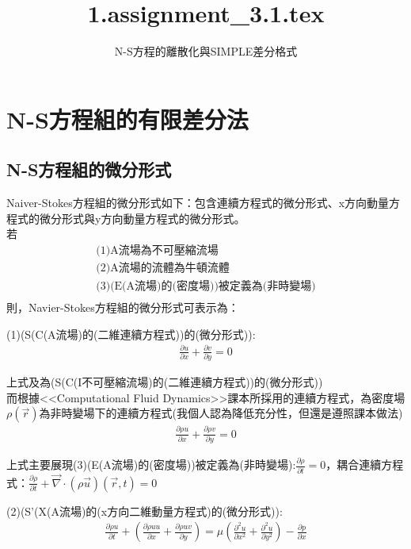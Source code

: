 \documentclass[12pt]{article}
\title{1.assignment\_3.1.tex}
\author{N-S方程的離散化與SIMPLE差分格式}
\begin{document}
\maketitle
\tableofcontents
\newpage
\section{N-S方程組的有限差分法}
\subsection{N-S方程組的微分形式}
Naiver-Stokes方程組的微分形式如下：包含連續方程式的微分形式、x方向動量方程式的微分形式與y方向動量方程式的微分形式。\\
\noindent 若
\[
\begin{array}{l}
    \text{(1)A流場為不可壓縮流場}\\[1.5ex]
    \text{(2)A流場的流體為牛頓流體}\\[1.5ex]
    \text{(3)(E(A流場)的(密度場))被定義為(非時變場)}\\[1.5ex]
\end{array}
\]
\noindent 則，Navier-Stokes方程組的微分形式可表示為：

(1)(S(C(A流場)的(二維連續方程式))的(微分形式)):
\begin{equation}\begin{split}
        \frac{\partial u}{\partial x} + \frac{\partial v}{\partial y} = 0 
\end{split}\end{equation}

上式及為(S(C(I不可壓縮流場)的(二維連續方程式))的(微分形式))\\
而根據<<Computational Fluid Dynamics>>課本所採用的連續方程式，為密度場$\rho(\vec{r})$為非時變場下的連續方程式(我個人認為降低充分性，但還是遵照課本做法)
\begin{equation}\begin{split}
    \frac{\partial \rho u }{\partial x} + \frac{\partial\rho v }{\partial y} = 0
\end{split}\end{equation}

上式主要展現(3)(E(A流場)的(密度場))被定義為(非時變場):$\frac{\partial \rho}{\partial t} = 0$，耦合連續方程式：$\frac{\partial \rho}{\partial t} + \vec{\nabla}\cdot (\rho\vec{u})(\vec{r},t) = 0$\\
\vspace{-1.9ex}

(2)(S'(X(A流場)的(x方向二維動量方程式)的(微分形式)):
\begin{equation}\begin{split}
    \frac{\partial \rho u}{\partial t} + (\frac{\partial \rho u u}{\partial x} + \frac{\partial \rho uv}{\partial y}) = \mu(\frac{\partial^2 u}{\partial x^2} + \frac{\partial^2 u}{\partial y^2}) -\frac{\partial p}{\partial x} 
\end{split}\end{equation}
\end{document}
